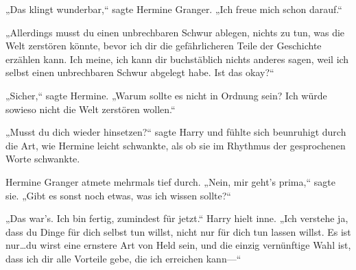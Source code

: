 „Das klingt wunderbar,“ sagte Hermine Granger. „Ich freue mich schon darauf.“

„Allerdings musst du einen unbrechbaren Schwur ablegen, nichts zu tun, was die Welt zerstören könnte, bevor ich dir die gefährlicheren Teile der Geschichte erzählen kann. Ich meine, ich kann dir buchstäblich nichts anderes sagen, weil ich selbst einen unbrechbaren Schwur abgelegt habe. Ist das okay?“

„Sicher,“ sagte Hermine. „Warum sollte es nicht in Ordnung sein? Ich würde sowieso nicht die Welt zerstören wollen.“

„Musst du dich wieder hinsetzen?“ sagte Harry und fühlte sich beunruhigt durch die Art, wie Hermine leicht schwankte, als ob sie im Rhythmus der gesprochenen Worte schwankte.

Hermine Granger atmete mehrmals tief durch. „Nein, mir geht’s prima,“ sagte sie.
„Gibt es sonst noch etwas, was ich wissen sollte?“

„Das war’s. Ich bin fertig, zumindest für jetzt.“
Harry hielt inne.
„Ich verstehe ja, dass du Dinge für dich selbst tun willst, nicht nur für dich tun lassen willst. Es ist nur…du wirst eine ernstere Art von Held sein, und die einzig vernünftige Wahl ist, dass ich dir alle Vorteile gebe, die ich erreichen kann—“

